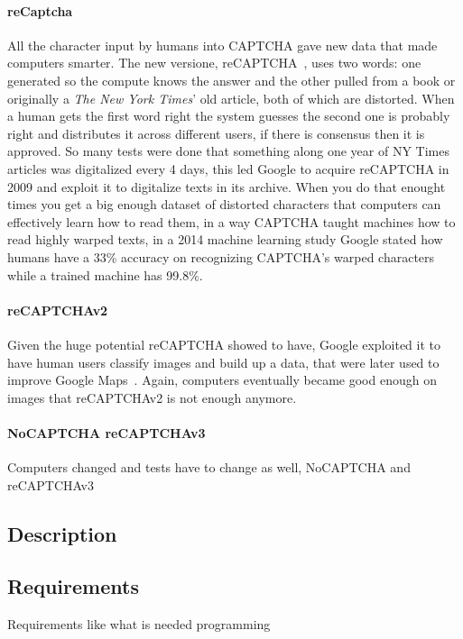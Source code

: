 \paragraph{reCaptcha}
All the character input by humans into CAPTCHA gave new data that made computers smarter.
The new versione, reCAPTCHA~\cite{ahn2008recaptcha}, uses two words: one generated so the compute knows the answer and the other pulled from a book or originally a \emph{The New York Times}' old article, both of which are distorted.
When a human gets the first word right the system guesses the second one is probably right and distributes it across different users, if there is consensus then it is approved.
So many tests were done that something along one year of NY Times articles was digitalized every 4 days, this led Google to acquire reCAPTCHA in 2009 and exploit it to digitalize texts in its archive.
When you do that enought times you get a big enough dataset of distorted characters that computers can effectively learn how to read them, in a way CAPTCHA taught machines how to read highly warped texts, in a 2014 machine learning study Google stated how humans have a 33\% accuracy on recognizing CAPTCHA's warped characters while a trained machine has 99.8\%.

\paragraph{reCAPTCHAv2}
Given the huge potential reCAPTCHA showed to have, Google exploited it to have human users classify images and build up a data, that were later used to improve Google Maps~\cite{vox2021captcha}.
Again, computers eventually became good enough on images that reCAPTCHAv2 is not enough anymore.

\paragraph{NoCAPTCHA reCAPTCHAv3}
Computers changed and tests have to change as well, NoCAPTCHA and reCAPTCHAv3

\subsection{Description}

\subsection{Requirements}
Requirements like what is needed programming